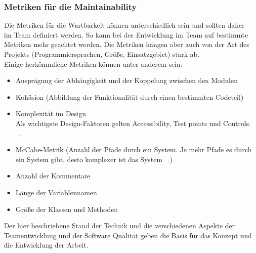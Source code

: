 \subsubsection{Metriken für die Maintainability}
Die Metriken für die Wartbarkeit können unterschiedlich sein und sollten daher im Team definiert werden. So kann bei der Entwicklung im Team auf bestimmte Metriken mehr geachtet  werden. Die Metriken hängen aber auch von der Art des Projekts (Programmiersprachen, Größe, Einsatzgebiet) stark ab. \\
Einige herkömmliche Metriken können unter anderem sein:

\begin{itemize} 
\item Ausprägung der Abhängigkeit und der Koppelung zwischen den Modulen 
\item Kohäsion (Abbildung der Funktionalität durch einen bestimmten Codeteil)
\item Komplexität im Design \\
Als wichtigste Design-Faktoren gelten Accessibility, Test points und Controls. ~\parencite{dhillonMaintainability}.
\item McCabe-Metrik (Anzahl der Pfade durch ein System. Je mehr Pfade es durch ein System gibt, desto komplexer ist das System ~\parencite{curtis1979measuring}.)
\item Anzahl der Kommentare
\item Länge der Variablennamen
\item Größe der Klassen und Methoden
\end{itemize}

Der hier beschriebene Stand der Technik und die verschiedenen Aspekte der Teamentwicklung und der Software Qualität geben die Basis für das Konzept und die Entwicklung der Arbeit.
\chapterend